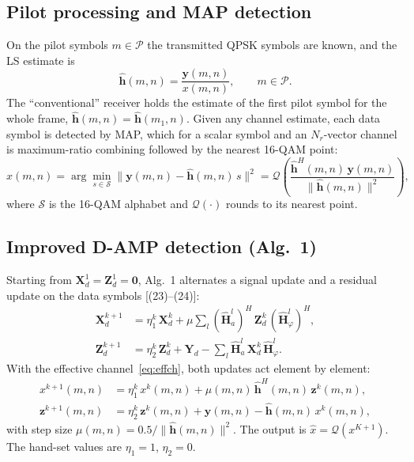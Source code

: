 \documentclass[11pt,a4paper]{article}
\newcommand{\BH}{\mathbf{H}}
\newcommand{\BX}{\mathbf{X}}
\newcommand{\BY}{\mathbf{Y}}
\newcommand{\BZ}{\mathbf{Z}}
\begin{document}
\subsection{Pilot processing and MAP detection}
On the pilot symbols $m\in\mathcal{P}$ the transmitted QPSK symbols are known, and the LS estimate is
\begin{equation}
  \hat{\mathbf{h}}(m,n)=\frac{\mathbf{y}(m,n)}{x(m,n)},\qquad m\in\mathcal{P}.
\label{eq:ls}
\end{equation}
The ``conventional'' receiver holds the estimate of the first pilot symbol for the whole frame, $\hat{\mathbf{h}}(m,n)=\hat{\mathbf{h}}(m_1,n)$. Given any channel estimate, each data symbol is detected by MAP, which for a scalar symbol and an $N_r$-vector channel is maximum-ratio combining followed by the nearest 16-QAM point:
\begin{equation}
  \hat{x}(m,n)=\arg\min_{s\in\mathcal{S}}\big\|\mathbf{y}(m,n)-\hat{\mathbf{h}}(m,n)\,s\big\|^2
  =\mathcal{Q}\!\left(\frac{\hat{\mathbf{h}}^H(m,n)\,\mathbf{y}(m,n)}{\|\hat{\mathbf{h}}(m,n)\|^2}\right),
\label{eq:map}
\end{equation}
where $\mathcal{S}$ is the 16-QAM alphabet and $\mathcal{Q}(\cdot)$ rounds to its nearest point.

\subsection{Improved D-AMP detection (Alg.~1)}
Starting from $\BX_d^1=\BZ_d^1=\mathbf{0}$, Alg.~1 alternates a signal update and a residual update on the data symbols [(23)--(24)]:
\begin{align}
  \BX_d^{k+1}&=\eta_1^k\,\BX_d^k+\mu\sum_{l}(\hat{\BH}_a^l)^H\,\BZ_d^k\,(\hat{\BH}_\varphi^l)^H,\label{eq:damp1}\\
  \BZ_d^{k+1}&=\eta_2^k\,\BZ_d^k+\BY_d-\sum_{l}\hat{\BH}_a^l\,\BX_d^k\,\hat{\BH}_\varphi^l.\label{eq:damp2}
\end{align}
With the effective channel~\eqref{eq:effch}, both updates act element by element:
\begin{equation}
\begin{aligned}
  x^{k+1}(m,n)&=\eta_1^k\,x^k(m,n)+\mu(m,n)\,\hat{\mathbf{h}}^H(m,n)\,\mathbf{z}^k(m,n),\\
  \mathbf{z}^{k+1}(m,n)&=\eta_2^k\,\mathbf{z}^k(m,n)+\mathbf{y}(m,n)-\hat{\mathbf{h}}(m,n)\,x^k(m,n),
\end{aligned}
\label{eq:dampre}
\end{equation}
with step size $\mu(m,n)=0.5/\|\hat{\mathbf{h}}(m,n)\|^2$. The output is $\hat{x}=\mathcal{Q}(x^{K+1})$. The hand-set values are $\eta_1=1$, $\eta_2=0$.
\end{document}
